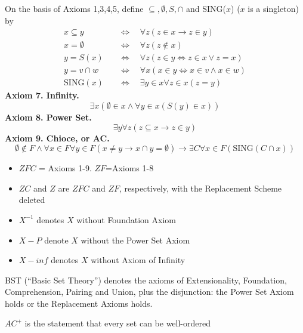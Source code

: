 \documentclass[11pt]{article}
\def \SING {\text{SING}}
\begin{document}
On the basis of Axioms 1,3,4,5, define \(\subseteq,\emptyset,S,\cap\) and SING(\(x\)) (\(x\) is a singleton) by
\begin{align*}
x\subseteq y&\quad\Leftrightarrow\quad\forall z(z\in x\to z\in y)\\
x=\emptyset&\quad\Leftrightarrow\quad\forall z(z\not\in x)\\
y=S(x)&\quad\Leftrightarrow\quad\forall z(z\in y\Leftrightarrow z\in x\vee z=x)\\
y=v\cap w&\quad\Leftrightarrow\quad\forall x(x\in y\Leftrightarrow x\in v\wedge x\in w)\\
\SING(x)&\quad\Leftrightarrow\quad\exists y\in x\forall z\in x(z=y)
\end{align*}
\textbf{Axiom 7. Infinity.}
\begin{equation*}
\exists x(\emptyset\in x\wedge\forall y\in x(S(y)\in x))
\end{equation*}
\textbf{Axiom 8. Power Set.}
\begin{equation*}
\exists y\forall z(z\subseteq x\to z\in y)
\end{equation*}
\textbf{Axiom 9. Chioce, or AC.}
\begin{equation*}
\emptyset\not\in F\wedge\forall x\in F\forall y\in F(x\neq y\to x\cap y=\emptyset)\to\exists C\forall x\in F(\SING(C\cap x))
\end{equation*}

\begin{itemize}
\item \(ZFC\) = Axioms 1-9. \hspace{1cm} \(ZF\)=Axioms 1-8
\item \(ZC\) and \(Z\) are \(ZFC\) and \(ZF\), respectively, with the Replacement Scheme deleted
\item \(X^{-1}\) denotes \(X\) without Foundation Axiom
\item \(X-P\) denote \(X\) without the Power Set Axiom
\item \(X-inf\) denotes \(X\) without Axiom of Infinity
\end{itemize}
\begin{definition}
BST (``Basic Set Theory'') denotes the axioms of Extensionality, Foundation, Comprehension, Pairing
and Union, plus the disjunction: the Power Set Axiom holds or the Replacement Axioms holds.
\end{definition}

\begin{definition}[]
\(AC^+\) is the statement that every set can be well-ordered
\end{definition}
\end{document}
